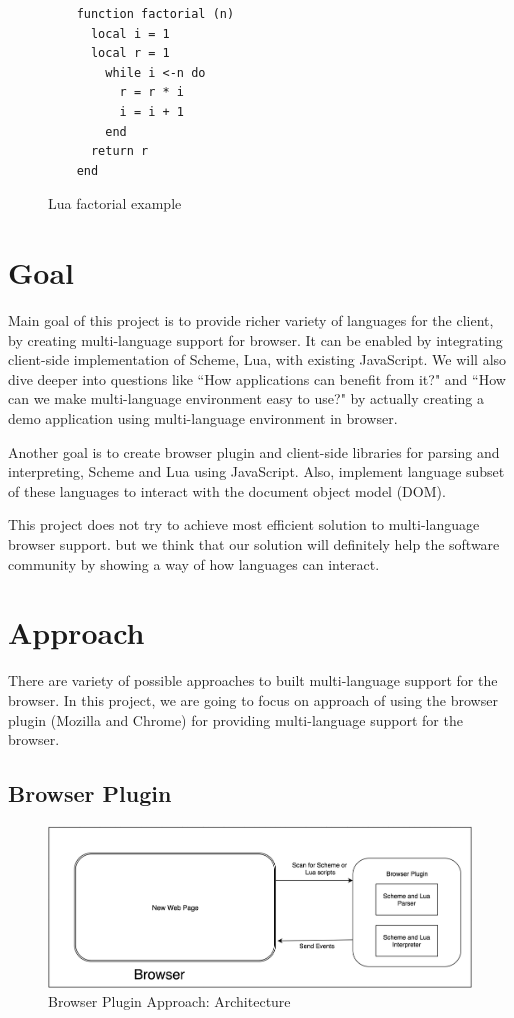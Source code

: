 \begin{figure}[h]
	\begin{lstlisting}
	function factorial (n)
	  local i = 1
	  local r = 1
	    while i <-n do 
	      r = r * i
	      i = i + 1
	    end
	  return r
 	end
	\end{lstlisting}
	\caption{Lua factorial example}
	\label{fig:luafactorial}
\end{figure}


\section{Goal}

Main goal of this project is to provide richer variety of languages for the client, by creating multi-language support for browser. It can be enabled by integrating client-side implementation of Scheme, Lua, with existing JavaScript. We will also dive deeper into questions like ``How applications can benefit from it?" and ``How can we make multi-language environment easy to use?" by actually creating a demo application using multi-language environment in browser.

Another goal is to create browser plugin and client-side libraries for parsing and interpreting, Scheme and Lua using JavaScript. Also, implement language subset of these languages to interact with the document object model (DOM).

This project does not try to achieve most efficient solution to multi-language browser support. but we think that our solution will definitely help the software community by showing a way of how languages can interact.

\section{Approach}

There are variety of possible approaches to built multi-language support for the browser. In this project, we are going to focus on approach of using the browser plugin (Mozilla and Chrome) for providing multi-language support for the browser. 

\subsection{Browser Plugin } 

\begin{figure}[h]
	\begin{center}
		\includegraphics[width=\linewidth]{./images/browserPluginApproach.png}
	\end{center}
	\caption{Browser Plugin Approach: Architecture}
	\label{fig:pluginarchitecture}
\end{figure}

